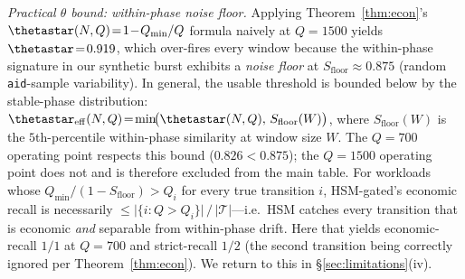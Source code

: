 \emph{Practical $\theta$ bound: within-phase noise floor.}
Applying Theorem~\ref{thm:econ}'s $\thetastar(N,Q)\!=\!1\!-\!Q_{\min}/Q$
formula naively at $Q\!=\!1500$ yields $\thetastar\!=\!0.919$, which
over-fires every window because the within-phase signature in our
synthetic burst exhibits a \emph{noise floor} at
$S_{\mathrm{floor}}\!\approx\!0.875$ (random \texttt{aid}-sample
variability).  In general, the usable threshold is bounded below by
the stable-phase distribution:
$\thetastar_{\mathrm{eff}}(N,Q)\!=\!\min\!\bigl(\thetastar(N,Q),\,
S_{\mathrm{floor}}(W)\bigr)$, where $S_{\mathrm{floor}}(W)$ is the
$5$th-percentile within-phase similarity at window size $W$.  The
$Q\!=\!700$ operating point respects this bound
($0.826\!<\!0.875$); the $Q\!=\!1500$ operating point does not and
is therefore excluded from the main table.  For workloads whose
$Q_{\min}\!/(1\!-\!S_{\mathrm{floor}})\!>\!Q_i$ for every true
transition $i$, HSM-gated's economic recall is necessarily
$\le\!\lvert\{i:Q\!>\!Q_i\}\rvert\,/\,|\mathcal{T}|$---i.e.\ HSM
catches every transition that is economic \emph{and} separable from
within-phase drift.  Here that yields economic-recall $1/1$ at
$Q\!=\!700$ and strict-recall $1/2$ (the second transition being
correctly ignored per Theorem~\ref{thm:econ}).  We return to this in
\S\ref{sec:limitations}(iv).
